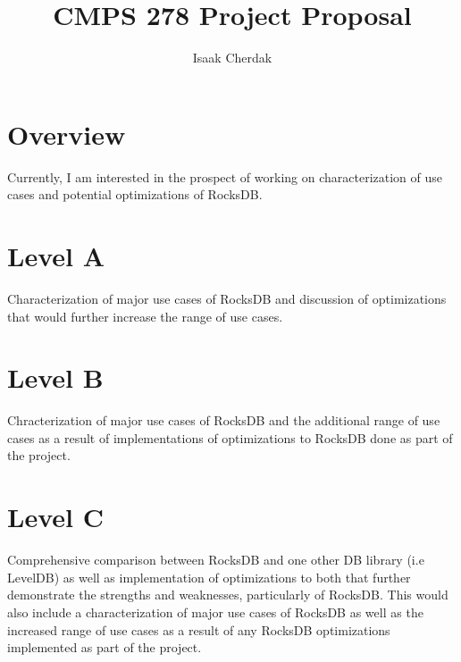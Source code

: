 \documentclass{article}
\title{CMPS 278 Project Proposal}
\author{Isaak Cherdak}
\begin{document}
\maketitle

\pagebreak

\section*{Overview}

 Currently, I am interested in the prospect of working on characterization of
use cases and potential optimizations of RocksDB.

\section*{Level A}

Characterization of major use cases of RocksDB and discussion of optimizations
that would further increase the range of use cases.

\section*{Level B}

Chracterization of major use cases of RocksDB and the additional range of use
cases as a result of implementations of optimizations to RocksDB done as part of
the project.

\section*{Level C}

Comprehensive comparison between RocksDB and one other DB library (i.e LevelDB)
as well as implementation of optimizations to both that further demonstrate the
strengths and weaknesses, particularly of RocksDB. This would also include a
characterization of major use cases of RocksDB as well as the increased range of
use cases as a result of any RocksDB optimizations implemented as part of the
project.
\end{document}
